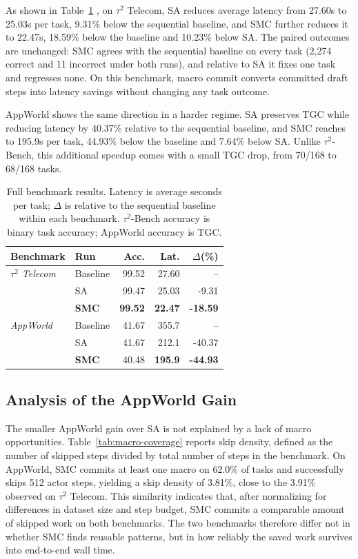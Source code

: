 As shown in Table~\ref{tab:main-results} , on $\tau^2$ Telecom, SA reduces average latency from 27.60s to 25.03s per task, 9.31\% below the sequential baseline, and SMC further reduces it to 22.47s, 18.59\% below the baseline and 10.23\% below SA. 
The paired outcomes are unchanged: SMC agrees with the sequential baseline on every task (2,274 correct and 11 incorrect under both runs), and relative to SA it fixes one task and regresses none. 
On this benchmark, macro commit converts committed draft steps into latency savings without changing any task outcome.

AppWorld shows the same direction in a harder regime. 
SA preserves TGC while reducing latency by 40.37\% relative to the sequential baseline, and SMC reaches to 195.9s per task, 44.93\% below the baseline and 7.64\% below SA. 
Unlike $\tau^2$-Bench, this additional speedup comes with a small TGC drop, from 70/168 to 68/168 tasks. 

\begin{table}[t]
\centering
\small
\caption{Full benchmark results. Latency is average seconds per task; $\Delta$ is relative to the sequential baseline within each benchmark. $\tau^2$-Bench accuracy is binary task accuracy; AppWorld accuracy is TGC.}
\label{tab:main-results}
\begin{tabular}{llrrr}
\toprule
Benchmark & Run & Acc. & Lat. & $\Delta$(\%) \\
\midrule
\multicolumn{1}{l}{\textit{$\tau^2$ Telecom}}
 & Baseline & 99.52 & 27.60 & -- \\
 & SA & 99.47 & 25.03 & -9.31 \\
 & \textbf{SMC} & \textbf{99.52} & \textbf{22.47} & \textbf{-18.59} \\
\midrule
\multicolumn{1}{l}{\textit{AppWorld}} 
 & Baseline & 41.67 & 355.7 & -- \\
 & SA & 41.67 & 212.1 & -40.37 \\
 & \textbf{SMC} & 40.48 & \textbf{195.9} & \textbf{-44.93} \\
\bottomrule
\end{tabular}
\end{table}

\subsection{Analysis of the AppWorld Gain}
The smaller AppWorld gain over SA is not explained by a lack of macro opportunities. 
Table~\ref{tab:macro-coverage} reports skip density, defined as the number of skipped steps divided by total number of steps in the benchmark.
On AppWorld, SMC commits at least one macro on 62.0\% of tasks and successfully skips 512 actor steps, yielding a skip density of 3.81\%, close to the 3.91\% observed on $\tau^2$ Telecom.
This similarity indicates that, after normalizing for differences in dataset size and step budget, SMC commits a comparable amount of skipped work on both benchmarks.
The two benchmarks therefore differ not in whether SMC finds reusable patterns, but in how reliably the saved work survives into end-to-end wall time.



